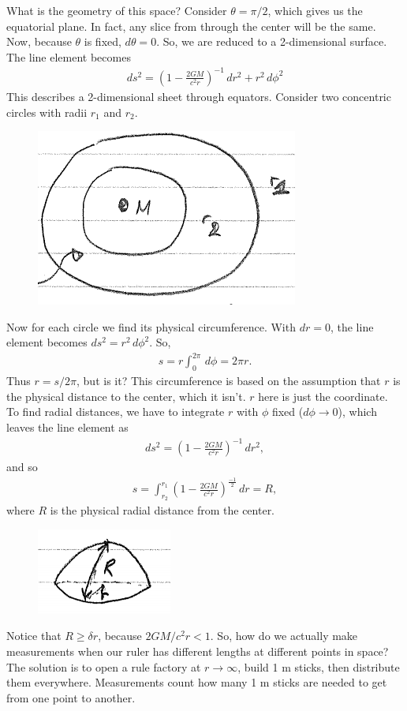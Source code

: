 \documentclass{book}
\theoremstyle{definition}
\newcommand{\f}[2]{\frac{#1}{#2}}
\newcommand{\lp}{\left(}
\newcommand{\rp}{\right)}
\begin{document}
What is the geometry of this space? Consider $\theta = \pi/2$, which gives us the equatorial plane. In fact, any slice from through the center will be the same. Now, because $\theta$ is fixed, $d\theta = 0$. So, we are reduced to a 2-dimensional surface. The line element becomes
\begin{align*}
\boxed{ds^2 = \left( 1 - \frac{2GM}{c^2r}\right)^{-1}\,dr^2 + r^2\,d\phi^2}
\end{align*}
This describes a 2-dimensional sheet through equators. Consider two concentric circles with radii $r_1$ and $r_2$. 
\begin{figure}[!htb]
	\centering
	\includegraphics[scale=0.5]{circs}
\end{figure}
Now for each circle we find its physical circumference. With $dr = 0$, the line element becomes $ds^2 = r^2\,d\phi^2$. So,
\begin{align*}
s = r \int^{2\pi}_{0}\,d\phi = 2\pi r.
\end{align*}
Thus $r = s/2\pi$, but is it? This circumference is based on the assumption that $r$ is the physical distance to the center, which it isn't. $r$ here is just the coordinate. To find radial distances, we have to integrate $r$ with $\phi$ fixed ($d\phi \to 0$), which leaves the line element as
\begin{align*}
ds^2 = \lp 1 - \f{2GM}{c^2r} \rp^{-1}\,dr^2,
\end{align*}
and so
\begin{align*}
s = \int^{r_1}_{r_2}\lp 1-  \f{2GM}{c^2r} \rp^{\f{-1}{2}}\,dr = R,
\end{align*}
where $R$ is the physical radial distance from the center. 
\begin{figure}[!htb]
	\centering
	\includegraphics[scale=0.8]{radial}
\end{figure}
Notice that $R \geq \delta r$, because $2GM/c^2r < 1$. So, how do we actually make measurements when our ruler has different lengths at different points in space? The solution is to open a rule factory at $r \to \infty$, build 1 m sticks, then distribute them everywhere. Measurements count how many 1 m sticks are needed to get from one point to another.\\
\end{document}
